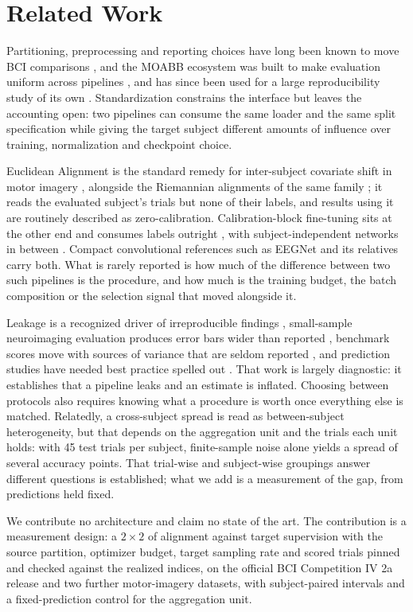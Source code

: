\section{Related Work}
\label{sec:related}

Partitioning, preprocessing and reporting choices have long been known to move BCI comparisons \cite{lotte2018review,roy2019deep}, and the MOABB ecosystem was built to make evaluation uniform across pipelines \cite{jayaram2018moabb}, and has since been used for a large reproducibility study of its own \cite{chevallier2024moabb}. Standardization constrains the interface but leaves the accounting open: two pipelines can consume the same loader and the same split specification while giving the target subject different amounts of influence over training, normalization and checkpoint choice.

Euclidean Alignment is the standard remedy for inter-subject covariate shift in motor imagery \cite{he2020transfer}, alongside the Riemannian alignments of the same family \cite{zanini2018transfer,rodrigues2019riemannian}; it reads the evaluated subject's trials but none of their labels, and results using it are routinely described as zero-calibration. Calibration-block fine-tuning sits at the other end and consumes labels outright \cite{wu2022transfer}, with subject-independent networks in between \cite{kwon2020subject}. Compact convolutional references such as EEGNet \cite{lawhern2018eegnet} and its relatives \cite{schirrmeister2017deep} carry both. What is rarely reported is how much of the difference between two such pipelines is the procedure, and how much is the training budget, the batch composition or the selection signal that moved alongside it.

Leakage is a recognized driver of irreproducible findings \cite{kapoor2023leakage}, small-sample neuroimaging evaluation produces error bars wider than reported \cite{varoquaux2018crossval,vabalas2019sample}, benchmark scores move with sources of variance that are seldom reported \cite{bouthillier2021variance}, and prediction studies have needed best practice spelled out \cite{poldrack2020best}. That work is largely diagnostic: it establishes that a pipeline leaks and an estimate is inflated. Choosing between protocols also requires knowing what a procedure is worth once everything else is matched. Relatedly, a cross-subject spread is read as between-subject heterogeneity, but that depends on the aggregation unit and the trials each unit holds: with 45 test trials per subject, finite-sample noise alone yields a spread of several accuracy points. That trial-wise and subject-wise groupings answer different questions is established; what we add is a measurement of the gap, from predictions held fixed.

We contribute no architecture and claim no state of the art. The contribution is a measurement design: a $2\times2$ of alignment against target supervision with the source partition, optimizer budget, target sampling rate and scored trials pinned and checked against the realized indices, on the official BCI Competition IV 2a release \cite{tangermann2012bcicompiv} and two further motor-imagery datasets, with subject-paired intervals and a fixed-prediction control for the aggregation unit.
